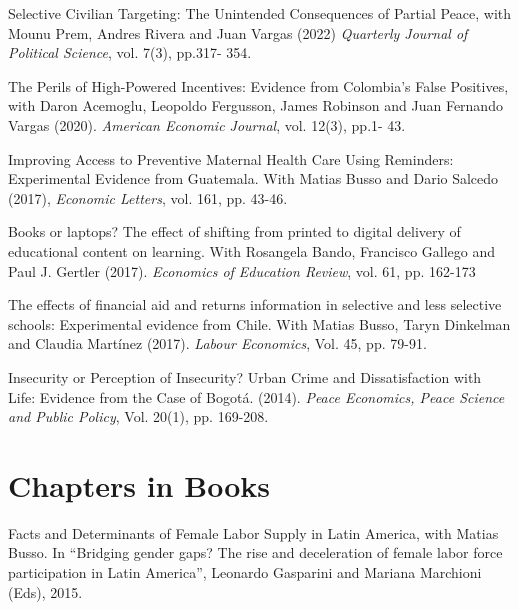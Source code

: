 \documentclass{moderncv}
\begin{document}
{Selective Civilian Targeting: The Unintended Consequences of Partial Peace, with Mounu Prem, Andres Rivera and Juan Vargas (2022) \emph{Quarterly Journal of Political Science}, vol. 7(3), pp.317- 354. \\}

{The Perils of High-Powered Incentives: Evidence from Colombia's False Positives, with Daron Acemoglu, Leopoldo Fergusson, James Robinson and Juan Fernando Vargas (2020). \emph{American Economic Journal}, vol. 12(3), pp.1- 43. \\ }  


{Improving Access to Preventive Maternal Health Care Using Reminders: Experimental Evidence from Guatemala. With Matias Busso and Dario Salcedo (2017), \emph{Economic Letters}, vol. 161, pp. 43-46.\\} 

{Books or laptops? The effect of shifting from printed to digital delivery of educational content on learning. With Rosangela Bando, Francisco Gallego and Paul J. Gertler (2017). \emph{Economics of Education Review}, vol. 61, pp. 162-173\\} 

{The effects of financial aid and returns information in selective and less selective schools: Experimental evidence from Chile. With Matias Busso, Taryn Dinkelman and Claudia Martínez (2017). \emph{Labour Economics}, Vol. 45, pp. 79-91.\\}

{Insecurity or Perception of Insecurity? Urban Crime and Dissatisfaction with Life: Evidence from the Case of Bogot\'a. (2014). \emph{Peace Economics, Peace Science and Public Policy}, Vol. 20(1), pp. 169-208.}

\section{\textbf{Chapters in Books}}
{Facts and Determinants of Female Labor Supply in Latin America, with Matias Busso. In “Bridging gender gaps? The rise and deceleration of female labor force participation in Latin America”, Leonardo Gasparini and Mariana Marchioni (Eds), 2015.}
\end{document}

